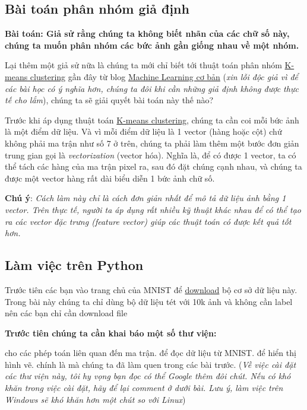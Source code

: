  
 
 
\subsection{Bài toán phân nhóm giả định}
\textbf{Bài toán: Giả sử rằng chúng ta không biết nhãn của các chữ số này, chúng ta muốn phân nhóm các bức ảnh gần giống nhau về một nhóm.} 
 
Lại thêm một giả sử nữa là chúng ta mới chỉ biết tới thuật toán phân nhóm \href{http://machinelearningcoban.com/2017/01/01/kmeans/}{K-means clustering} gần đây từ blog \href{https://tiepvupsu.github.io/}{Machine Learning cơ bản} (\textit{xin lỗi độc giả vì để các bài học có ý nghĩa hơn, chúng ta đôi khi cần những giả định không được thực tế cho lắm}), chúng ta sẽ giải quyết bài toán này thế nào? 
 
Trước khi áp dụng thuật toán \href{http://machinelearningcoban.com/2017/01/01/kmeans/}{K-means clustering}, chúng ta cần coi mỗi bức ảnh là một điểm dữ liệu. Và vì mỗi điểm dữ liệu là 1 vector (hàng hoặc cột) chứ không phải ma trận như số 7 ở trên, chúng ta phải làm thêm một bước đơn giản trung gian gọi là \textit{vectorization} (vector hóa). Nghĩa là, để có được 1 vector, ta có thể tách các hàng của ma trận pixel ra, sau đó đặt chúng cạnh nhau, và chúng ta được một vector hàng rất dài biểu diễn 1 bức ảnh chữ số.  
 
\textbf{Chú ý}: \textit{Cách làm này chỉ là cách đơn giản nhất để mô tả dữ liệu ảnh bằng 1 vector. Trên thực tế, người ta áp dụng rất nhiều kỹ thuật khác nhau để có thể tạo ra các vector đặc trưng (feature vector) giúp các thuật toán có được kết quả tốt hơn.} 
 
 
\subsection{Làm việc trên Python}
Trước tiên các bạn vào trang chủ của MNIST để \href{http://yann.lecun.com/exdb/mnist/ }{download} bộ cơ sở dữ liệu này. Trong bài này chúng ta chỉ dùng bộ dữ liệu tét với 10k ảnh và không cần label nên các bạn chỉ cần download file  
 
 
\textbf{Trước tiên chúng ta cần khai báo một số thư viện:} 
 
 cho các phép toán liên quan đến ma trận. \href{https://pypi.python.org/pypi/python-mnist/}{} để đọc dữ liệu từ MNIST.  để hiển thị hình vẽ.  chính là  mà chúng ta đã làm quen trong các bài trước. (\textit{Về việc cài đặt các thư viện này, tôi hy vọng bạn đọc có thể Google thêm đôi chút. Nếu có khó khăn trong việc cài đặt, hãy để lại comment ở dưới bài. Lưu ý, làm việc trên Windows sẽ khó khăn hơn một chút so với Linux}) 
 
